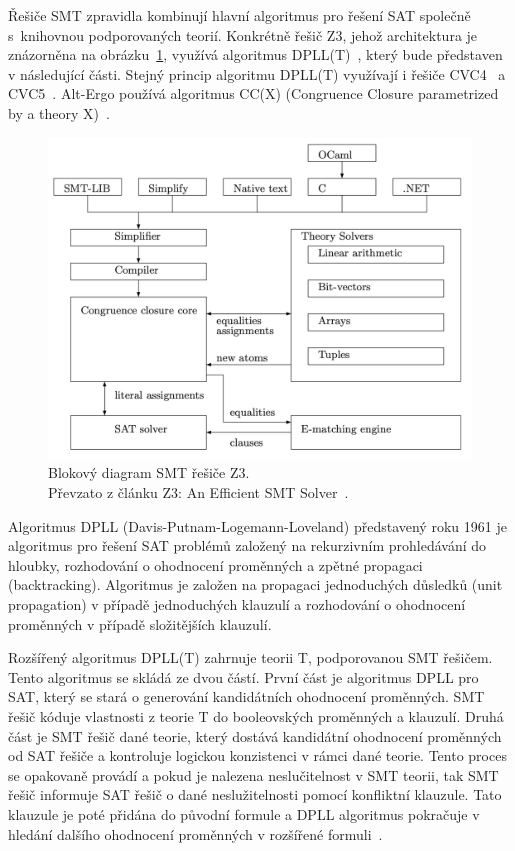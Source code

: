 Řešiče SMT zpravidla kombinují hlavní algoritmus pro řešení SAT společně
s~knihovnou podporovaných teorií.
Konkrétně řešič Z3, jehož architektura je znázorněna na obrázku~\ref{fig:z3-block-diagram}, využívá algoritmus DPLL(T)~\cite{Z3Intro},
který bude představen v následující části.
Stejný princip algoritmu DPLL(T) využívají i řešiče CVC4~\cite{cvc4_website} a CVC5~\cite{cvc5_website}.
Alt-Ergo používá algoritmus CC(X) (Congruence Closure parametrized by a theory X)~\cite{AltErgo}.

\begin{figure}[H]
    \centering
    \includegraphics[width=\linewidth]{images/smt-structure}
    \caption{
        Blokový diagram SMT řešiče Z3. \\
        Převzato z článku Z3: An Eﬃcient SMT Solver~\cite{Z3}.
    }
    \label{fig:z3-block-diagram}
\end{figure}

Algoritmus DPLL (Davis-Putnam-Logemann-Loveland) představený roku 1961
je algoritmus pro řešení SAT problémů
založený na rekurzivním prohledávání do hloubky, rozhodování o ohodnocení proměnných a zpětné propagaci (backtracking).
Algoritmus je založen na propagaci jednoduchých důsledků (unit propagation) v případě jednoduchých klauzulí
a rozhodování o ohodnocení proměnných v případě složitějších klauzulí.

Rozšířený algoritmus DPLL(T) zahrnuje teorii T, podporovanou SMT řešičem.
Tento algoritmus se skládá ze dvou částí.
První část je algoritmus DPLL pro SAT, který se stará o generování kandidátních ohodnocení proměnných.
SMT řešič kóduje vlastnosti z teorie T do booleovských proměnných a klauzulí.
Druhá část je SMT řešič dané teorie, který dostává kandidátní ohodnocení proměnných od SAT řešiče a kontroluje logickou konzistenci
v rámci dané teorie.
Tento proces se opakovaně provádí a pokud je nalezena neslučitelnost v SMT teorii,
tak SMT řešič informuje SAT řešič o dané neslužitelnosti pomocí konfliktní klauzule.
Tato klauzule je poté přidána do původní formule a DPLL algoritmus pokračuje v hledání dalšího ohodnocení proměnných
v rozšířené formuli~\cite{DPLLT}.

